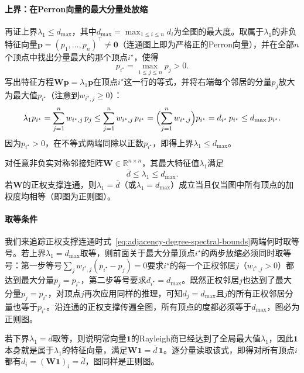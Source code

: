 \paragraph{上界：在Perron向量的最大分量处放缩}

再证上界$\lambda_1\leq d_{\max}$，其中$d_{\max}=\max_{1\leq i\leq n}d_i$为全图的最大度。取属于$\lambda_1$的非负特征向量$\bm p=(p_1,\ldots,p_n)^\top\neq\bm 0$（连通图上即为严格正的Perron向量），并在全部$n$个顶点中找出分量最大的那个顶点$i^\star$，使得
\[
p_{i^\star}=\max_{1\leq j\leq n}p_j>0.
\]
写出特征方程$\bm W\bm p=\lambda_1\bm p$在顶点$i^\star$这一行的等式，并将右端每个邻居的分量$p_j$放大为最大值$p_{i^\star}$（注意到$w_{i^\star,j}\geq 0$）：
\[
\lambda_1 p_{i^\star}
=\sum_{j=1}^n w_{i^\star,j}\,p_j
\leq\sum_{j=1}^n w_{i^\star,j}\,p_{i^\star}
=\Bigl(\sum_{j=1}^n w_{i^\star,j}\Bigr)p_{i^\star}
=d_{i^\star}\,p_{i^\star}
\leq d_{\max}\,p_{i^\star}.
\]
因为$p_{i^\star}>0$，在不等式两端同除以正数$p_{i^\star}$，即得上界$\lambda_1\leq d_{\max}$。

\begin{theorem}[最大邻接特征值的度界]
\label{prop:adjacency-degree-bounds}
对任意非负实对称邻接矩阵$\bm W\in\mathbb R^{n\times n}$，其最大特征值$\lambda_1$满足
\begin{equation}
\overline d\leq\lambda_1\leq d_{\max}.
\label{eq:adjacency-degree-spectral-bounds}
\end{equation}
若$\bm W$的正权支撑连通，则$\lambda_1=\overline d$（或$\lambda_1=d_{\max}$）成立当且仅当图中所有顶点的加权度均相等（即图为正则图）。
\end{theorem}

\paragraph{取等条件}

我们来追踪正权支撑连通时式~\eqref{eq:adjacency-degree-spectral-bounds}两端何时取等号。若上界$\lambda_1=d_{\max}$取等，则前面关于最大分量顶点$i^\star$的两步放缩必须同时取等号：第一步等号$\sum_j w_{i^\star,j}(p_{i^\star}-p_j)=0$要求$i^\star$的每一个正权邻居$j$（$w_{i^\star,j}>0$）都达到最大分量$p_j=p_{i^\star}$，第二步等号要求$d_{i^\star}=d_{\max}$。既然正权邻居$j$也达到了最大分量$p_j=p_{i^\star}$，对顶点$j$再次应用同样的推理，可知$d_j=d_{\max}$且$j$的所有正权邻居分量也等于$p_{i^\star}$。沿连通的正权支撑传遍全图，所有顶点的度都必须等于$d_{\max}$，图必为正则图。

若下界$\lambda_1=\overline d$取等，则说明常向量$\bm 1$的Rayleigh商已经达到了全局最大值$\lambda_1$，因此$\bm 1$本身就是属于$\lambda_1$的特征向量，满足$\bm W\bm 1=\overline d\,\bm 1$。逐分量读取该式，即得对所有顶点$i$都有$d_i=(\bm W\bm 1)_i=\overline d$，图同样是正则图。

